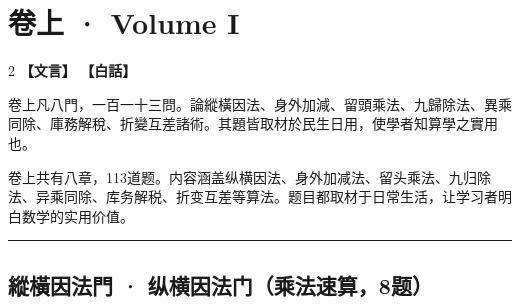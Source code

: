 \documentclass[11pt,a4paper]{article}
\newcommand{\longline}{\noindent\rule{\textwidth}{0.4pt}}
\begin{document}
\section{卷上 · Volume I}

\begin{paracol}{2}
\noindent\textbf{\textcolor{leftlabel}{【文言】}}
\switchcolumn
\noindent\textbf{\textcolor{rightlabel}{【白話】}}
\switchcolumn*

卷上凡八門，一百一十三問。論縱橫因法、身外加減、留頭乘法、九歸除法、異乘同除、庫務解稅、折變互差諸術。其題皆取材於民生日用，使學者知算學之實用也。

\switchcolumn

卷上共有八章，113道题。内容涵盖纵横因法、身外加减法、留头乘法、九归除法、异乘同除、库务解税、折变互差等算法。题目都取材于日常生活，让学习者明白数学的实用价值。

\end{paracol}

\longline

\subsection{縱橫因法門 · 纵横因法门（乘法速算，8题）}
\label{sec:zongheng}
\end{document}
